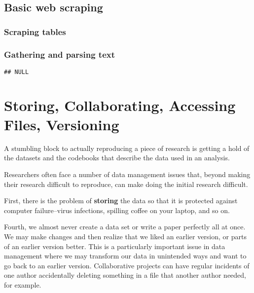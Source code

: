 \documentclass[ChapterTOCs,krantz1]{krantz}\usepackage{graphicx, color}
\makeatletter
\newenvironment{kframe}{%
 \def\at@end@of@kframe{}%
 \ifinner\ifhmode%
  \def\at@end@of@kframe{\end{minipage}}%
  \begin{minipage}{\columnwidth}%
 \fi\fi%
 \def\FrameCommand##1{\hskip\@totalleftmargin \hskip-\fboxsep
 \colorbox{shadecolor}{##1}\hskip-\fboxsep
     \hskip-\linewidth \hskip-\@totalleftmargin \hskip\columnwidth}%
 \MakeFramed {\advance\hsize-\width
   \@totalleftmargin\z@ \linewidth\hsize
   \@setminipage}}%
 {\par\unskip\endMakeFramed%
 \at@end@of@kframe}
\newenvironment{knitrout}{}{} %
\makeatother
\begin{document}
\section{Basic web scraping}

\subsection{Scraping tables}

\subsection{Gathering and parsing text}


\begin{knitrout}
\color{fgcolor}\begin{kframe}
\begin{verbatim}
## NULL
\end{verbatim}
\end{kframe}
\end{knitrout}


\chapter{Storing, Collaborating, Accessing Files, Versioning}

A stumbling block to actually reproducing a piece of research is getting
a hold of the datasets and the codebooks that describe the data used in
an analysis.

Researchers often face a number of data management issues that, beyond
making their research difficult to reproduce, can make doing the initial
research difficult.

First, there is the problem of \textbf{storing} the data so that it is
protected against computer failure--virus infections, spilling coffee on
your laptop, and so on.

Fourth, we almost never create a data set or write a paper perfectly all
at once. We may make changes and then realize that we liked an earlier
version, or parts of an earlier version better. This is a particularly
important issue in data management where we may transform our data in
unintended ways and want to go back to an earlier version. Collaborative
projects can have regular incidents of one author accidentally deleting
something in a file that another author needed, for example.
\end{document}
